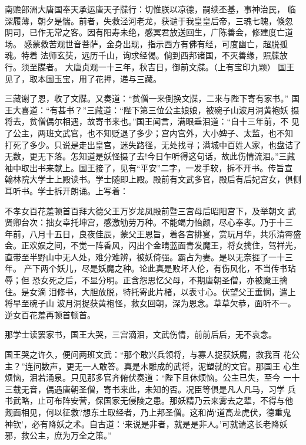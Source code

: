 南赡部洲大唐国奉天承运唐天子牒行：切惟朕以凉德，嗣续丕基，事神治民，
临深履薄，朝夕是惴。前者，失救泾河老龙，获谴于我皇皇后帝，三魂七魄，倏忽
阴司，已作无常之客。因有阳寿未绝，感冥君放送回生，广陈善会，修建度亡道场。
感蒙救苦观世音菩萨，金身出现，指示西方有佛有经，可度幽亡，超脱孤魂。特着
法师玄奘，远历千山，询求经偈。倘到西邦诸国，不灭善缘，照牒放行。须至牒者。
大唐贞观一十三年，秋吉日，御前文牒。（上有宝印九颗）
国王见了，取本国玉宝，用了花押，递与三藏。

三藏谢了恩，收了文牒。又奏道：“贫僧一来倒换文牒，二来与陛下寄有家书。”
国王大喜道：“有甚书？”三藏道：“陛下第三位公主娘娘，被碗子山波月洞黄袍妖
摄将去，贫僧偶尔相遇，故寄书来也。”国王闻言，满眼垂泪道：“自十三年前，不
见了公主，两班文武官，也不知贬退了多少；宫内宫外，大小婢子、太监，也不知
打死了多少。只说是走出皇宫，迷失路径，无处找寻；满城中百姓人家，也盘诘了
无数，更无下落。怎知道是妖怪摄了去!今日乍听得这句话，故此伤情流泪。”三藏
袖中取出书来献上。国王接了，见有“平安”二字，一发手软，拆不开书。传旨宣
翰林院大学士上殿读书。学士随即上殿。殿前有文武多官，殿后有后妃宫女，俱侧
耳听书。学士拆开朗诵。上写着：

不孝女百花羞顿首百拜大德父王万岁龙凤殿前暨三宫母后昭阳宫下，及举朝文
武贤卿台次：拙女幸托坤宫，感激劬劳万种。不能竭力怡颜，尽心奉孝。乃于十三
年前，八月十五日，良夜佳辰，蒙父王恩旨，着各宫排宴，赏玩月华，共乐清霄盛
会。正欢娱之间，不觉一阵香风，闪出个金睛蓝面青发魔王，将女擒住，驾祥光，
直带至半野山中无人处，难分难辨，被妖倚强。霸占为妻。是以无奈捱了一十三年。
产下两个妖儿，尽是妖魔之种。论此真是败坏人伦，有伤风化，不当传书玷辱；但
恐女死之后，不显分明。正含怨思忆父母，不期唐朝圣僧，亦被魔王擒住。是女滴
泪修书，大胆放脱，特托寄此片楮，以表寸心。伏望父王垂悯，遣上将早至碗子山
波月洞捉获黄袍怪，救女回朝，深为恩念。草草欠恭，面听不一。
逆女百花羞再顿首顿首。

那学士读罢家书，国王大哭，三宫滴泪，文武伤情，前前后后，无不哀念。

国王哭之许久，便问两班文武：“那个敢兴兵领将，与寡人捉获妖魔，救我百
花公主？”连问数声，更无一人敢答。真是木雕成的武将，泥塑就的文官。那国王
心生烦恼，泪若涌泉。只见那多官齐俯伏奏道：“陛下且休烦恼。公主已失，至今
一十三载无音，偶遇唐朝圣僧，寄书来此，未知的否。况臣等俱是凡人凡马，习学
兵书武略，止可布阵安营，保国家无侵陵之患。那妖精乃云来雾去之辈，不得与他
觌面相见，何以征救?想东土取经者，乃上邦圣僧。这和尚‘道高龙虎伏，德重鬼
神钦’，必有降妖之术。自古道：‘来说是非者，就是是非人。’可就请这长老降妖
邪，救公主，庶为万全之策。”


